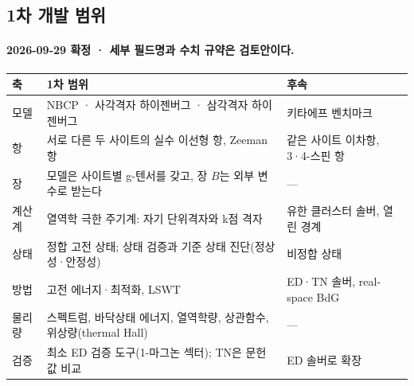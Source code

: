 \subsection{1차 개발 범위}\label{first-scope}
\begingroup%
  \framesubtitle{2026-09-29 확정 · 세부 필드명과 수치 규약은 검토안이다.}
  \small
  \begin{tabularx}{\textwidth}{@{}p{1.6cm}Yp{4.1cm}@{}}
    \toprule
    축 & 1차 범위 & 후속 \\
    \midrule
    모델 & NBCP · 사각격자 하이젠버그 · 삼각격자 하이젠버그 & 키타에프 벤치마크 \\
    항 & 서로 다른 두 사이트의 실수 이선형 항, Zeeman 항 & 같은 사이트 이차항, 3·4-스핀 항 \\
    장 & 모델은 사이트별 g-텐서를 갖고, 장 $B$는 외부 변수로 받는다 & — \\
    계산계 & 열역학 극한 주기계: 자기 단위격자와 k점 격자 & 유한 클러스터 솔버, 열린 경계 \\
    상태 & 정합 고전 상태; 상태 검증과 기준 상태 진단(정상성·안정성) & 비정합 상태 \\
    방법 & 고전 에너지·최적화, LSWT & ED·TN 솔버, real-space BdG \\
    물리량 & 스펙트럼, 바닥상태 에너지, 열역학량, 상관함수, 위상량(thermal Hall) & — \\
    검증 & 최소 ED 검증 도구(1-마그논 섹터); TN은 문헌값 비교 & ED 솔버로 확장 \\
    \bottomrule
  \end{tabularx}
  \par\medskip
\endgroup

